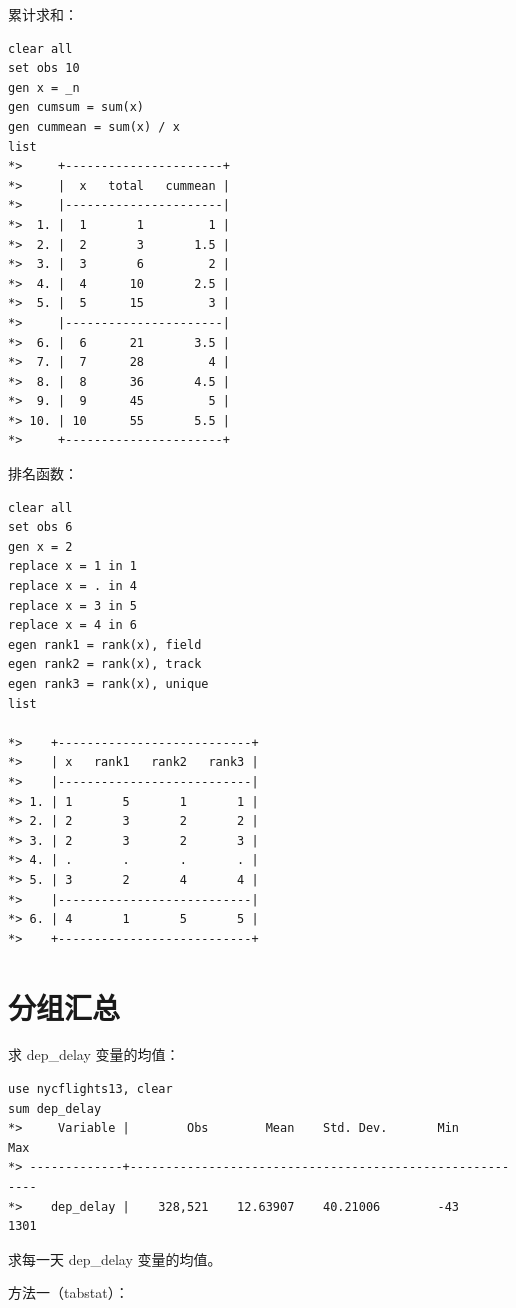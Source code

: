 累计求和：

\begin{lstlisting}
clear all
set obs 10
gen x = _n
gen cumsum = sum(x)
gen cummean = sum(x) / x
list
*>     +----------------------+
*>     |  x   total   cummean |
*>     |----------------------|
*>  1. |  1       1         1 |
*>  2. |  2       3       1.5 |
*>  3. |  3       6         2 |
*>  4. |  4      10       2.5 |
*>  5. |  5      15         3 |
*>     |----------------------|
*>  6. |  6      21       3.5 |
*>  7. |  7      28         4 |
*>  8. |  8      36       4.5 |
*>  9. |  9      45         5 |
*> 10. | 10      55       5.5 |
*>     +----------------------+
\end{lstlisting}

排名函数：

\begin{lstlisting}
clear all
set obs 6
gen x = 2
replace x = 1 in 1
replace x = . in 4
replace x = 3 in 5
replace x = 4 in 6
egen rank1 = rank(x), field
egen rank2 = rank(x), track
egen rank3 = rank(x), unique
list

*>    +---------------------------+
*>    | x   rank1   rank2   rank3 |
*>    |---------------------------|
*> 1. | 1       5       1       1 |
*> 2. | 2       3       2       2 |
*> 3. | 2       3       2       3 |
*> 4. | .       .       .       . |
*> 5. | 3       2       4       4 |
*>    |---------------------------|
*> 6. | 4       1       5       5 |
*>    +---------------------------+
\end{lstlisting}

\section{分组汇总}

求 dep\_delay 变量的均值：

\begin{lstlisting}
use nycflights13, clear
sum dep_delay
*>     Variable |        Obs        Mean    Std. Dev.       Min        Max
*> -------------+---------------------------------------------------------
*>    dep_delay |    328,521    12.63907    40.21006        -43       1301
\end{lstlisting}

求每一天 dep\_delay 变量的均值。

方法一（tabstat）：

